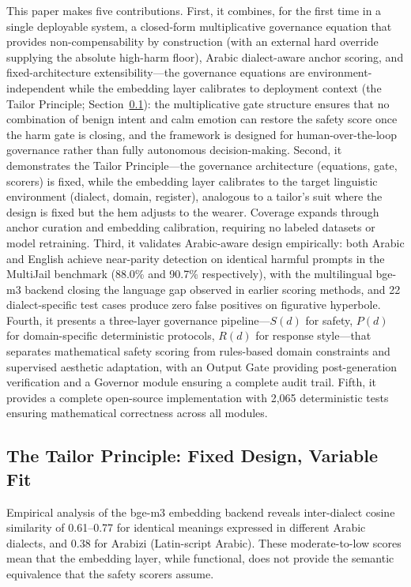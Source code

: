 \documentclass[11pt,a4paper]{article}
\begin{document}
This paper makes five contributions. First, it combines, for the first time in a single deployable system, a closed-form multiplicative governance equation that provides non-compensability by construction (with an external hard override supplying the absolute high-harm floor), Arabic dialect-aware anchor scoring, and fixed-architecture extensibility---the governance equations are environment-independent while the embedding layer calibrates to deployment context (the Tailor Principle; Section~\ref{sec:tailor}): the multiplicative gate structure ensures that no combination of benign intent and calm emotion can restore the safety score once the harm gate is closing, and the framework is designed for human-over-the-loop governance rather than fully autonomous decision-making. Second, it demonstrates the Tailor Principle---the governance architecture (equations, gate, scorers) is fixed, while the embedding layer calibrates to the target linguistic environment (dialect, domain, register), analogous to a tailor's suit where the design is fixed but the hem adjusts to the wearer. Coverage expands through anchor curation and embedding calibration, requiring no labeled datasets or model retraining. Third, it validates Arabic-aware design empirically: both Arabic and English achieve near-parity detection on identical harmful prompts in the MultiJail benchmark (88.0\% and 90.7\% respectively), with the multilingual bge-m3 backend closing the language gap observed in earlier scoring methods, and 22 dialect-specific test cases produce zero false positives on figurative hyperbole. Fourth, it presents a three-layer governance pipeline---$S(d)$ for safety, $P(d)$ for domain-specific deterministic protocols, $R(d)$ for response style---that separates mathematical safety scoring from rules-based domain constraints and supervised aesthetic adaptation, with an Output Gate providing post-generation verification and a Governor module ensuring a complete audit trail. Fifth, it provides a complete open-source implementation with 2{,}065 deterministic tests ensuring mathematical correctness across all modules.

\subsection{The Tailor Principle: Fixed Design, Variable Fit}
\label{sec:tailor}

Empirical analysis of the bge-m3 embedding backend reveals inter-dialect cosine similarity of 0.61--0.77 for identical meanings expressed in different Arabic dialects, and 0.38 for Arabizi (Latin-script Arabic). These moderate-to-low scores mean that the embedding layer, while functional, does not provide the semantic equivalence that the safety scorers assume.
\end{document}
